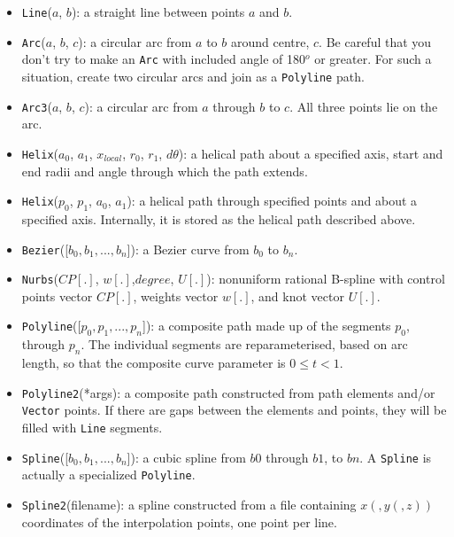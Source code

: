 \documentclass[12pt,a4paper,twoside]{article}
\begin{document}
\begin{itemize}
\item \texttt{Line}($a$, $b$): a straight line between points $a$ and $b$.
\item \texttt{Arc}($a$, $b$, $c$): a circular arc from $a$ to $b$ around centre,
  $c$.
  Be careful that you don't try to make an \texttt{Arc} with included angle of 180$^o$ or greater.
  For such a situation, create two circular arcs and join as a \texttt{Polyline} path.
\item \texttt{Arc3}($a$, $b$, $c$): a circular arc from $a$ through $b$ to $c$.
  All three points lie on the arc.
\item \texttt{Helix}($a_0$, $a_1$, $x_{local}$, $r_0$, $r_1$, $d\theta$): a helical path
  about a specified axis, start and end radii and angle through which the path extends.
\item \texttt{Helix}($p_0$, $p_1$, $a_0$, $a_1$): a helical path through specified points
  and about a specified axis.
  Internally, it is stored as the helical path described above.
\item \texttt{Bezier}([$b_0, b_1, ..., b_n$]): a Bezier curve from $b_0$ to
  $b_n$.
\item \texttt{Nurbs}($CP[.]$, $w[.]$,$degree$, $U[.]$): nonuniform rational B-spline with
  control points vector $CP[.]$, weights vector $w[.]$, and knot vector $U[.]$.
\item \texttt{Polyline}([$p_0, p_1, ..., p_n$]): a composite path made up of 
  the segments $p_0$, through $p_n$.
  The individual segments are reparameterised, based on arc length, so that
  the composite curve parameter is $0 \le t < 1$.
\item \texttt{Polyline2}(*args): a composite path constructed from path elements and/or \texttt{Vector} points.
  If there are gaps between the elements and points, 
  they will be filled with \texttt{Line} segments.
\item \texttt{Spline}([$b_0, b_1, ..., b_n$]): a cubic spline from $b0$ through
  $b1$, to $bn$.
  A \texttt{Spline} is actually a specialized \texttt{Polyline}.
\item \texttt{Spline2}(filename): a spline constructed from a file containing $x(,y(,z))$ coordinates
  of the interpolation points, one point per line.

\end{itemize}
\end{document}
